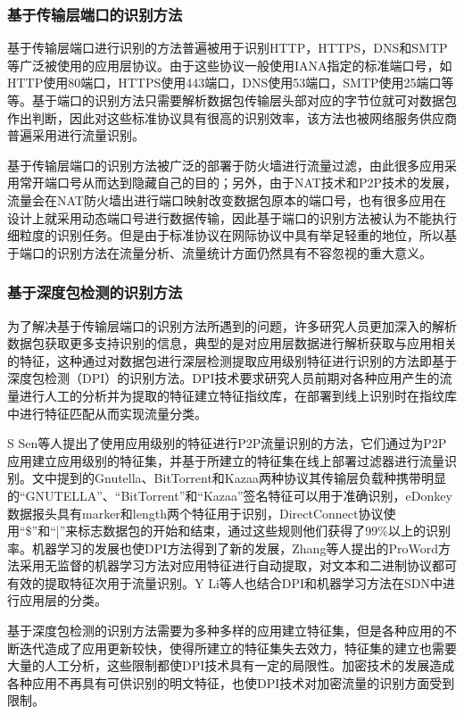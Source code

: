 \subsubsection{基于传输层端口的识别方法}
基于传输层端口进行识别的方法普遍被用于识别HTTP，HTTPS，DNS和SMTP等广泛被使用的应用层协议。由于这些协议一般使用IANA指定的标准端口号，如HTTP使用80端口，HTTPS使用443端口，DNS使用53端口，SMTP使用25端口等等。基于端口的识别方法只需要解析数据包传输层头部对应的字节位就可对数据包作出判断，因此对这些标准协议具有很高的识别效率，该方法也被网络服务供应商普遍采用进行流量识别。

基于传输层端口的识别方法被广泛的部署于防火墙进行流量过滤，由此很多应用采用常开端口号从而达到隐藏自己的目的；另外，由于NAT技术和P2P技术的发展，流量会在NAT防火墙出进行端口映射改变数据包原本的端口号，也有很多应用在设计上就采用动态端口号进行数据传输，因此基于端口的识别方法被认为不能执行细粒度的识别任务\supercite{port1,port2}。但是由于标准协议在网际协议中具有举足轻重的地位，所以基于端口的识别方法在流量分析、流量统计方面仍然具有不容忽视的重大意义。

\subsubsection{基于深度包检测的识别方法}
为了解决基于传输层端口的识别方法所遇到的问题，许多研究人员更加深入的解析数据包获取更多支持识别的信息，典型的是对应用层数据进行解析获取与应用相关的特征，这种通过对数据包进行深层检测提取应用级别特征进行识别的方法即基于深度包检测（DPI）的识别方法。DPI技术要求研究人员前期对各种应用产生的流量进行人工的分析并为提取的特征建立特征指纹库，在部署到线上识别时在指纹库中进行特征匹配从而实现流量分类。

S Sen等人提出了使用应用级别的特征进行P2P流量识别的方法，它们通过为P2P应用建立应用级别的特征集，并基于所建立的特征集在线上部署过滤器进行流量识别\supercite{18}。文中提到的Gnutella、BitTorrent和Kazaa两种协议其传输层负载种携带明显的“GNUTELLA”、“BitTorrent”和“Kazaa”签名特征可以用于准确识别，eDonkey数据报头具有marker和length两个特征用于识别，DirectConnect协议使用“\$”和“|”来标志数据包的开始和结束，通过这些规则他们获得了99\%以上的识别率。机器学习的发展也使DPI方法得到了新的发展，Zhang等人提出的ProWord方法采用无监督的机器学习方法对应用特征进行自动提取，对文本和二进制协议都可有效的提取特征次用于流量识别\supercite{dpi1}。Y Li等人也结合DPI和机器学习方法在SDN中进行应用层的分类\supercite{dpi2}。

基于深度包检测的识别方法需要为多种多样的应用建立特征集，但是各种应用的不断迭代造成了应用更新较快，使得所建立的特征集失去效力，特征集的建立也需要大量的人工分析，这些限制都使DPI技术具有一定的局限性。加密技术的发展造成各种应用不再具有可供识别的明文特征，也使DPI技术对加密流量的识别方面受到限制。


